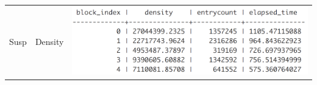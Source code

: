 \begin{table}[h!tbp]
\begin{tabular} {p{1.5cm}|p{2cm}|p{12cm}}
      \hline Susp & Density & \parbox[c]{1em}{
      \includegraphics[width=5in]{report_table_sus_density.png}} \\
      \hline
  \end{tabular}
\end{table}


